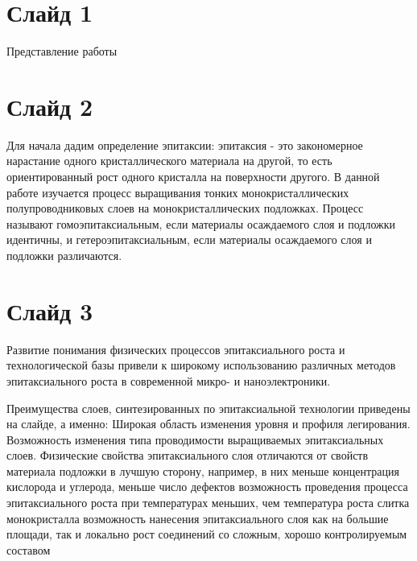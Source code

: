 


\def\labauthors{}
\def\labgroup{430}
\def\labnumber{ последней}
\def\labtheme{МПЭ}



\section*{Слайд 1}
Представление работы

\section*{Слайд 2}
Для начала дадим определение эпитаксии: эпитаксия - это закономерное нарастание одного кристаллического материала на другой, то есть ориентированный рост одного кристалла на поверхности другого. В данной работе изучается процесс выращивания тонких монокристаллических полупроводниковых слоев на монокристаллических подложках. Процесс называют гомоэпитаксиальным, если материалы осаждаемого слоя и подложки идентичны, и гетероэпитаксиальным, если материалы осаждаемого слоя и подложки различаются. 
\section*{Слайд 3}

Развитие понимания физических процессов эпитаксиального роста и технологической базы привели к широкому использованию различных методов эпитаксиального роста в современной микро- и наноэлектроники.

Преимущества слоев, синтезированных по эпитаксиальной технологии приведены на слайде, а именно:
Широкая область изменения уровня и профиля легирования. Возможность изменения типа проводимости выращиваемых эпитаксиальных слоев. Физические свойства эпитаксиального слоя отличаются от свойств материала подложки в лучшую сторону, например, в них меньше концентрация кислорода и углерода, меньше число дефектов возможность проведения процесса эпитаксиального роста при температурах меньших, чем температура роста слитка монокристалла возможность нанесения эпитаксиального слоя как на большие площади, так и локально рост соединений со сложным, хорошо контролируемым составом
